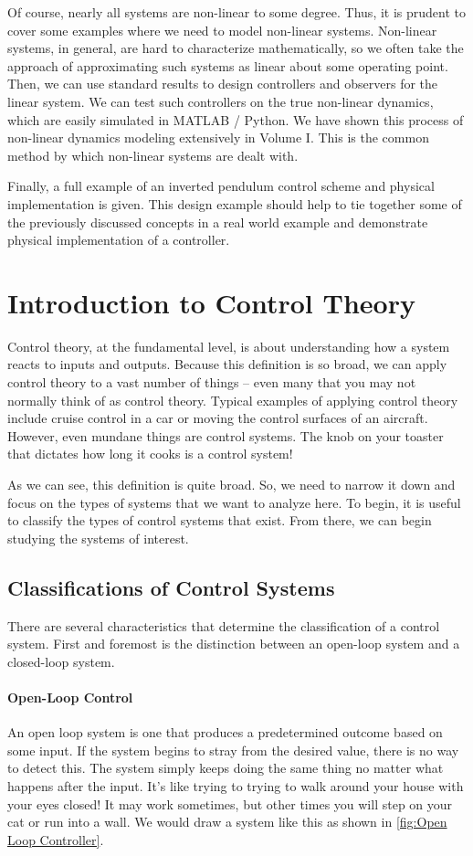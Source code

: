 Of course, nearly all systems are non-linear to some degree. Thus, it is prudent to cover some examples where we need to model non-linear systems. Non-linear systems, in general, are hard to characterize mathematically, so we often take the approach of approximating such systems as linear about some operating point. Then, we can use standard results to design controllers and observers for the linear system. We can test such controllers on the true non-linear dynamics,  which are easily simulated in MATLAB / Python. We have shown this process of non-linear dynamics modeling extensively in Volume I. This is the common method by which non-linear systems are dealt with.

Finally, a full example of an inverted pendulum control scheme and physical implementation is given. This design example should help to tie together some of the previously discussed concepts in a real world example and demonstrate physical implementation of a controller.

\chapter{Introduction to Control Theory}\label{chap:intro to controls}
Control theory, at the fundamental level, is about understanding how a system reacts to inputs and outputs. Because this definition is so broad, we can apply control theory to a vast number of things -- even many that you may not normally think of as control theory. Typical examples of applying control theory include cruise control in a car or moving the control surfaces of an aircraft. However, even mundane things are control systems. The knob on your toaster that dictates how long it cooks is a control system!

As we can see, this definition is quite broad. So, we need to narrow it down and focus on the types of systems that we want to analyze here. To begin, it is useful to classify the types of control systems that exist. From there, we can begin studying the systems of interest.

\section{Classifications of Control Systems}
There are several characteristics that determine the classification of a control system. First and foremost is the distinction between an open-loop system and a closed-loop system.

\subsubsection{Open-Loop Control}
An open loop system is one that produces a predetermined outcome based on some input. If the system begins to stray from the desired value, there is no way to detect this. The system simply keeps doing the same thing no matter what happens after the input. It's like trying to trying to walk around your house with your eyes closed! It may work sometimes, but other times you will step on your cat or run into a wall. We would draw a system like this as shown in \autoref{fig:Open Loop Controller}.

